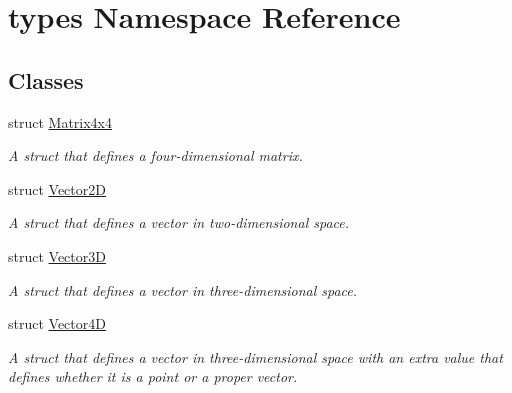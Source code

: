\hypertarget{namespacetypes}{}\section{types Namespace Reference}
\label{namespacetypes}
\subsection*{Classes}
\begin{DoxyCompactItemize}
\item 
struct \hyperlink{structtypes_1_1_matrix4x4}{Matrix4x4}
\begin{DoxyCompactList}\small\item\em A struct that defines a four-\/dimensional matrix. \end{DoxyCompactList}\item 
struct \hyperlink{structtypes_1_1_vector2_d}{Vector2\+D}
\begin{DoxyCompactList}\small\item\em A struct that defines a vector in two-\/dimensional space. \end{DoxyCompactList}\item 
struct \hyperlink{structtypes_1_1_vector3_d}{Vector3\+D}
\begin{DoxyCompactList}\small\item\em A struct that defines a vector in three-\/dimensional space. \end{DoxyCompactList}\item 
struct \hyperlink{structtypes_1_1_vector4_d}{Vector4\+D}
\begin{DoxyCompactList}\small\item\em A struct that defines a vector in three-\/dimensional space with an extra value that defines whether it is a point or a proper vector. \end{DoxyCompactList}\end{DoxyCompactItemize}
